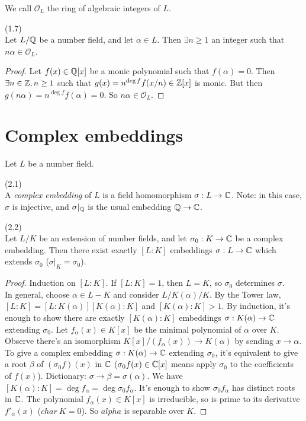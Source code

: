 \documentclass[a4paper]{article}
\begin{document}
We call $\mathcal{O}_L$ the ring of algebraic integers of $L$.

\begin{lemma} (1.7)\\
Let $L/\mathbb{Q}$ be a number field, and let $\alpha \in L$. Then $\exists n \geq 1$ an integer such that $n\alpha \in \mathcal{O}_L$.
\begin{proof}
Let $f(x) \in \mathbb{Q}[x]$ be a monic polynomial such that $f(\alpha) = 0$. Then $\exists n\in \mathbb{Z}, n \geq 1$ such that $g(x) = n^{\deg f} f(x/n) \in \mathbb{Z}[x]$ is monic. But then $g(n\alpha) = n^{\deg f} f(\alpha) = 0$. So $n\alpha \in \mathcal{O}_L$.
\end{proof}
\end{lemma}

\newpage

\section{Complex embeddings}
Let $L$ be a number field.
\begin{defi} (2.1)\\
A \emph{complex embedding} of $L$ is a field homomorphism $\sigma: L \to \mathbb{C}$. Note: in this case, $\sigma$ is injective, and $\sigma|_{\mathbb{Q}}$ is the usual embedding $\mathbb{Q} \to \mathbb{C}$.
\end{defi}

\begin{prop} (2.2)\\
Let $L/K$ be an extension of number fields, and let $\sigma_0:K \to \mathbb{C}$ be a complex embedding. Then there exist exactly $[L:K]$ embeddings $\sigma:L \to \mathbb{C}$ which extends $\sigma_0$ ($\sigma|_K = \sigma_0$).
\begin{proof}
Induction on $[L:K]$. If $[L:K] = 1$, then $L=K$, so $\sigma_0$ determines $\sigma$.\\

In general, choose $\alpha \in L-K$ and consider $L/K(\alpha)/K$. By the Tower law, $[L:K] = [L:K(\alpha)][K(\alpha):K]$ and $[K(\alpha):K]>1$. By induction, it's enough to show there are exactly $[K(\alpha):K]$ embeddings $\sigma:K(\alpha) \to \mathbb{C}$ extending $\sigma_0$. Let $f_\alpha(x) \in K[x]$ be the minimal polynomial of $\alpha$ over $K$. Observe there's an isomorphism $K[x] / (f_\alpha(x)) \to K(\alpha)$ by sending $x \to \alpha$. To give a complex embedding $\sigma:K(\alpha) \to \mathbb{C}$ extending $\sigma_0$, it's equivalent to give a root $\beta$ of $(\sigma_0 f)(x)$ in $\mathbb{C}$ ($\sigma_0 f(x) \in \mathbb{C}[x]$ means apply $\sigma_0$ to the coefficients of $f(x)$). Dictionary: $\sigma \to \beta = \sigma (\alpha)$. We have $[K(\alpha):K] = \deg f_\alpha = \deg \sigma_0 f_\alpha$. It's enough to show $\sigma_0 f_\alpha$ has distinct roots in $\mathbb{C}$. The polynomial $f_\alpha(x) \in K[x]$ is irreducible, so is prime to its derivative $f'_\alpha(x)$ ($char\ K =0$). So $alpha$ is separable over $K$.
\end{proof}
\end{prop}
\end{document}
